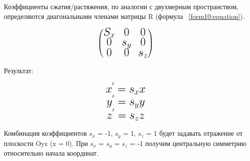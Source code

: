 Коэффициенты сжатия/растяжения, по аналогии с двухмерным пространством, определяются диагональными членами матрицы R (формула ~\ref{form10:equation}).

\begin{equation}
	\fontsize{17}{20}{
		\left(
		\begin{matrix}
			S_{x} & 0 & 0 \\
			0 & s_{y} & 0 \\
			0 & 0 & s_{z}
		\end{matrix}
		\right)}
	\label{form10:equation}
\end{equation}

\vspace*{5mm}Результат:

\begin{equation}
	\fontsize{17}{20}{
		\begin{matrix}
			x^{'} = s_{x}x \\
			y^{'} = s_{y}y \\
			z^{'} = s_{z}z
		\end{matrix}}
	\label{form11:equation}
\end{equation}

Комбинация коэффициентов $s_x$ = -1, $s_y$ = 1, $s_z$ = 1 будет задавать отражение от плоскости Oyz (x = 0). При $s_x$ = $s_y$ = $s_z$ = -1 получим центральную симметрию относительно начала координат.